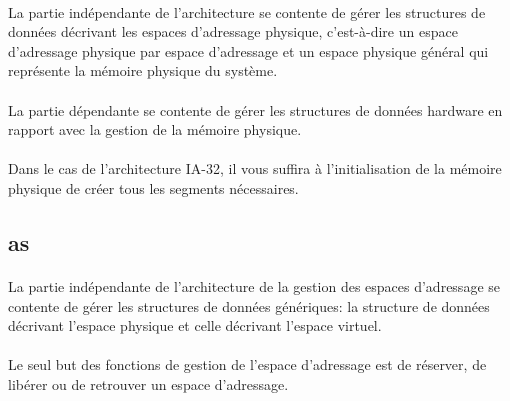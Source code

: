\documentclass[10pt,a4wide]{article}
\begin{document}
\paragraph{}

La partie ind\'ependante de l'architecture se contente de g\'erer les
structures de donn\'ees d\'ecrivant les espaces d'adressage physique,
c'est-\`a-dire un espace d'adressage physique par espace d'adressage
et un espace physique g\'en\'eral qui repr\'esente la m\'emoire
physique du syst\`eme.

\paragraph{}

La partie d\'ependante se contente de g\'erer les structures de donn\'ees
hardware en rapport avec la gestion de la m\'emoire physique.

\paragraph{}

Dans le cas de l'architecture IA-32, il vous suffira \`a l'initialisation de la
m\'emoire physique de cr\'eer tous les segments n\'ecessaires.

\subsection{as}

\paragraph{}

La partie ind\'ependante de l'architecture de la gestion des espaces
d'adressage se contente de g\'erer les structures de donn\'ees
g\'en\'eriques: la structure de donn\'ees d\'ecrivant l'espace physique
et celle d\'ecrivant l'espace virtuel.

\paragraph{}

Le seul but des fonctions de gestion de l'espace d'adressage est de
r\'eserver, de lib\'erer ou de retrouver un espace d'adressage.

\paragraph{}
\end{document}
